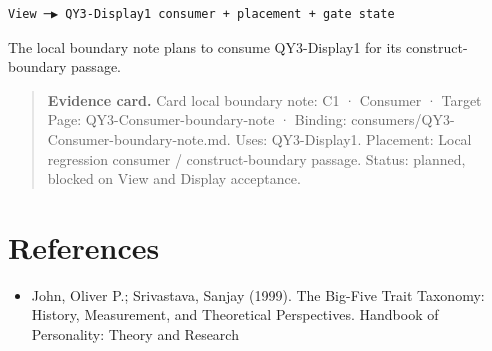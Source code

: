 \documentclass[11pt]{article}
\begin{document}
\begin{Verbatim}[fontsize=\small]
View ─▶ QY3-Display1 consumer + placement + gate state
\end{Verbatim}
The local boundary note plans to consume QY3-Display1 for its construct-boundary passage.

\begin{quote}\footnotesize\textbf{Evidence card.} Card local boundary note: C1 · Consumer · Target Page: QY3-Consumer-boundary-note · Binding: consumers/QY3-Consumer-boundary-note.md. Uses: QY3-Display1. Placement: Local regression consumer / construct-boundary passage. Status: planned, blocked on View and Display acceptance.\end{quote}
\section{References}\begin{itemize}
\item John, Oliver P.; Srivastava, Sanjay (1999). The Big-Five Trait Taxonomy: History, Measurement, and Theoretical Perspectives. Handbook of Personality: Theory and Research
\end{itemize}
\end{document}
